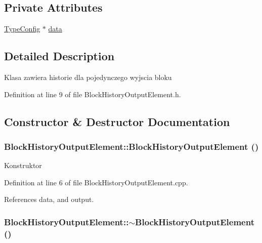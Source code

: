 \subsection*{Private Attributes}
\begin{CompactItemize}
\item 
\hyperlink{classTypeConfig}{TypeConfig} $\ast$ \hyperlink{classBlockHistoryOutputElement_fcac98db485905d1cd9db29212c769a3}{data}
\end{CompactItemize}


\subsection{Detailed Description}
Klasa zawiera historie dla pojedynczego wyjscia bloku 

Definition at line 9 of file BlockHistoryOutputElement.h.

\subsection{Constructor \& Destructor Documentation}
\hypertarget{classBlockHistoryOutputElement_08ab623b57a5a66e65042064c64134c3}{
\subsubsection[BlockHistoryOutputElement]{\setlength{\rightskip}{0pt plus 5cm}BlockHistoryOutputElement::BlockHistoryOutputElement ()}}
\label{classBlockHistoryOutputElement_08ab623b57a5a66e65042064c64134c3}


Konstruktor 

Definition at line 6 of file BlockHistoryOutputElement.cpp.

References data, and output.\hypertarget{classBlockHistoryOutputElement_80f68f40d930d60dddae536a7acb08bf}{
\subsubsection[$\sim$BlockHistoryOutputElement]{\setlength{\rightskip}{0pt plus 5cm}BlockHistoryOutputElement::$\sim$BlockHistoryOutputElement ()}}
\label{classBlockHistoryOutputElement_80f68f40d930d60dddae536a7acb08bf}


